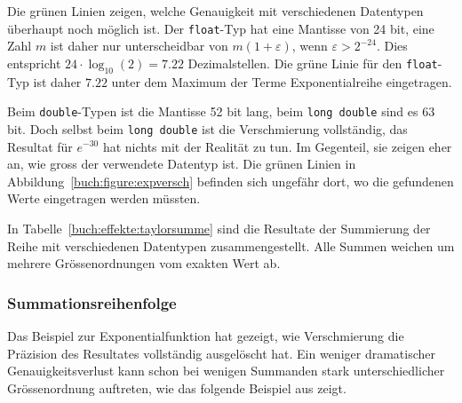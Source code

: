 \bgroup
{}
Die {\color{darkgreen}grünen} Linien zeigen, welche Genauigkeit mit
verschiedenen Datentypen überhaupt noch möglich ist.
Der \texttt{float}-Typ hat eine Mantisse von 24 bit, eine Zahl $m$ ist
daher nur unterscheidbar von $m(1+\varepsilon)$, wenn $\varepsilon > 2^{-24}$.
%
Dies entspricht $24\cdot \log_{10}(2) = 7.22$ Dezimalstellen.
Die {\color{darkgreen}grüne} Linie für den \texttt{float}-Typ ist daher
$7.22$ unter dem Maximum der Terme Exponentialreihe eingetragen.
%

Beim \texttt{double}-Typen ist die Mantisse 52 bit lang, beim
\texttt{long double} sind es 63 bit.
Doch selbst beim \texttt{long double} ist die Verschmierung vollständig,
das Resultat für $e^{-30}$ hat nichts mit der Realität zu tun.
%
Im Gegenteil, sie zeigen eher an, wie gross der verwendete Datentyp ist.
Die {\color{darkgreen}grünen} Linien in Abbildung~\ref{buch:figure:expversch}
befinden sich ungefähr dort, wo die gefundenen Werte
eingetragen werden müssten.
\egroup

In Tabelle~\ref{buch:effekte:taylorsumme} sind die Resultate der
Summierung der Reihe mit verschiedenen Datentypen zusammengestellt.
%
Alle Summen weichen um mehrere Grössenordnungen vom exakten Wert ab.

\subsubsection{Summationsreihenfolge}
Das Beispiel zur Exponentialfunktion hat gezeigt, wie Verschmierung
die Präzision des Resultates vollständig ausgelöscht hat.
%
%
%
Ein weniger dramatischer Genauigkeitsverlust kann schon bei wenigen
Summanden stark unterschiedlicher Grössenordnung auftreten, wie das
folgende Beispiel aus \cite{buch:kahan-summation} zeigt.
%

